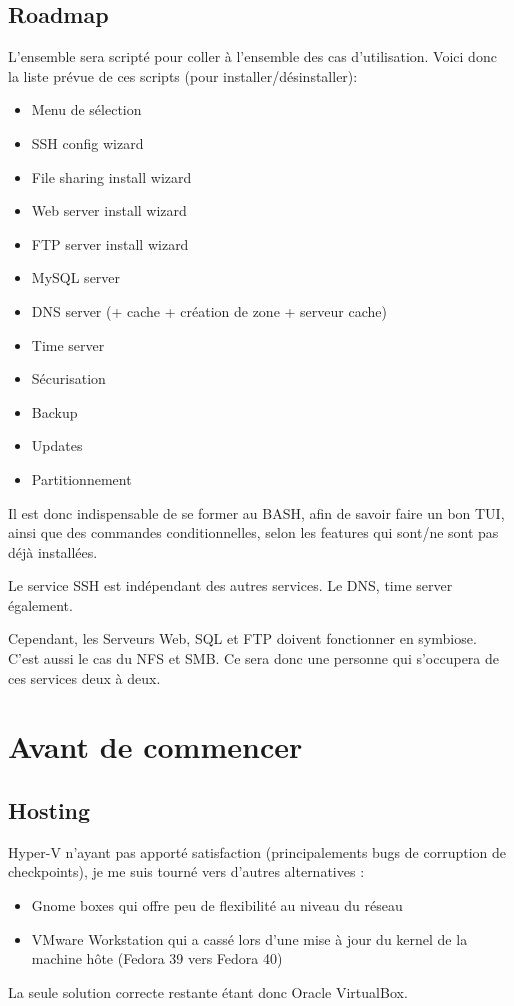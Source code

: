 \documentclass{article}
\begin{document}
\subsection{Roadmap}
L'ensemble sera scripté pour coller à l'ensemble des cas d'utilisation. Voici donc la liste prévue de ces scripts (pour installer/désinstaller):
\begin{itemize}
\item Menu de sélection
\item SSH config wizard
			\item File sharing install wizard
			\item Web server install wizard
			\item FTP server install wizard
			\item MySQL server 
			\item DNS server (+ cache + création de zone + serveur cache)
			\item Time server
			\item Sécurisation
			\item Backup
			\item Updates
			\item Partitionnement
		\end{itemize}
		Il est donc indispensable de se former au BASH, afin de savoir faire un bon TUI, ainsi que des commandes conditionnelles, selon les features qui sont/ne sont pas déjà installées.
		
		Le service SSH est indépendant des autres services. Le DNS, time server également.
		
		Cependant, les Serveurs Web, SQL et FTP doivent fonctionner en symbiose. C'est aussi le cas du NFS et SMB. Ce sera donc une personne qui s'occupera de ces services deux à deux.
	
\pagebreak

\section{Avant de commencer}
	
\subsection{Hosting}
	
Hyper-V n'ayant pas apporté satisfaction (principalements bugs de corruption de checkpoints), je me suis tourné vers d'autres alternatives :
\begin{itemize}
\item Gnome boxes qui offre peu de flexibilité au niveau du réseau
\item VMware Workstation qui a cassé lors d'une mise à jour du kernel de la machine hôte (Fedora 39 vers Fedora 40)
\end{itemize}
La seule solution correcte restante étant donc Oracle VirtualBox.
	
\end{document}
